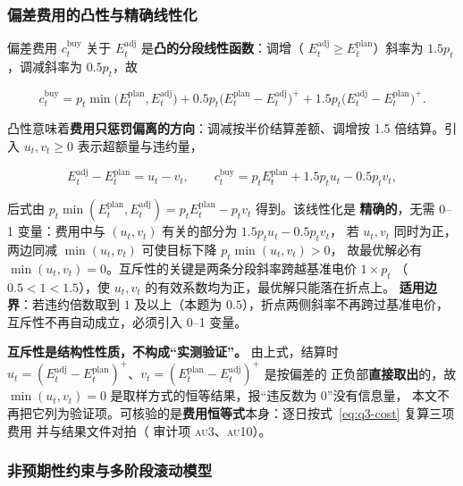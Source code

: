 \subsubsection{偏差费用的凸性与精确线性化}

偏差费用 \(c^{\text{buy}}_t\) 关于 \(E^{\text{adj}}_t\) 是\textbf{凸的分段线性函数}：调增（\allowbreak
\(E^{\text{adj}}_t\ge E^{\text{plan}}_t\)）斜率为 \(1.5p_t\)，调减斜率为 \(0.5p_t\)，故

\begin{equation}
  c_t^{\text{buy}}
  =p_t\min\bigl(E^{\text{plan}}_t,E^{\text{adj}}_t\bigr)
  +0.5p_t\bigl(E^{\text{plan}}_t-E^{\text{adj}}_t\bigr)^{+}
  +1.5p_t\bigl(E^{\text{adj}}_t-E^{\text{plan}}_t\bigr)^{+}.
  \label{eq:q3-cost}
\end{equation}

凸性意味着\textbf{费用只惩罚偏离的方向}：调减按半价结算差额、调增按 1.5 倍结算。引入
\(u_t,v_t\ge0\) 表示超额量与违约量，

\begin{equation}
  E^{\text{adj}}_t-E^{\text{plan}}_t=u_t-v_t,\qquad
  c_t^{\text{buy}}=p_tE^{\text{plan}}_t+1.5p_tu_t-0.5p_tv_t ,
  \label{eq:q3-lin}
\end{equation}

后式由 \(p_t\min(E^{\text{plan}}_t,E^{\text{adj}}_t)=p_tE^{\text{plan}}_t-p_tv_t\) 得到。该线性化是
\textbf{精确的}，无需 0--1 变量：费用中与 \((u_t,v_t)\) 有关的部分为 \(1.5p_tu_t-0.5p_tv_t\)，
若 \(u_t,v_t\) 同时为正，两边同减 \(\min(u_t,v_t)\) 可使目标下降 \(p_t\min(u_t,v_t)>0\)，
故最优解必有 \(\min(u_t,v_t)=0\)。互斥性的关键是两条分段斜率跨越基准电价 \(1\times p_t\)
（\(0.5<1<1.5\)），使 \(u_t,v_t\) 的有效系数均为正，最优解只能落在折点上。
\textbf{适用边界}：若违约倍数取到 \(1\) 及以上（本题为 \(0.5\)），折点两侧斜率不再跨过基准电价，
互斥性不再自动成立，必须引入 0--1 变量。

\textbf{互斥性是结构性性质，不构成“实测验证”。} 由上式，结算时
\(u_t=(E^{\text{adj}}_t-E^{\text{plan}}_t)^{+}\)、\(v_t=(E^{\text{plan}}_t-E^{\text{adj}}_t)^{+}\) 是按偏差的
正负部\textbf{直接取出}的，故 \(\min(u_t,v_t)=0\) 是取样方式的恒等结果，报“违反数为 0”没有信息量，
本文不再把它列为验证项。可核验的是\textbf{费用恒等式}本身：逐日按式~\eqref{eq:q3-cost} 复算三项费用
并与结果文件对拍（ 审计项 \textsc{au}3、\textsc{au}10）。

\subsubsection{非预期性约束与多阶段滚动模型}\label{sec:q3-mpc}\label{sec:q3-roll}

